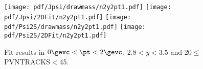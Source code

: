 \begin{figure}[H]
\begin{center}
\texttt{[image: pdf/Jpsi/drawmass/n2y2pt1.pdf]}
\texttt{[image: pdf/Jpsi/2DFit/n2y2pt1.pdf]}
\vspace*{-0.5cm}
\texttt{[image: pdf/Psi2S/drawmass/n2y2pt1.pdf]}
\texttt{[image: pdf/Psi2S/2DFit/n2y2pt1.pdf]}
\vspace*{-0.5cm}
\end{center}
\caption{Fit results in $0\gevc<\pt<2\gevc$, $2.8<y<3.5$ and 20$\leq$PVNTRACKS$<$45.}
\label{Fitn2y2pt1}
\end{figure}

